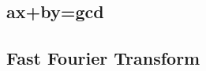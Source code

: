 \documentclass[a4paper,10pt,twocolumn,oneside]{article}
\begin{document}
\subsection{ax+by=gcd}


%

\subsection{Fast Fourier Transform}


%

%

%

%

%

%

%
\end{document}
